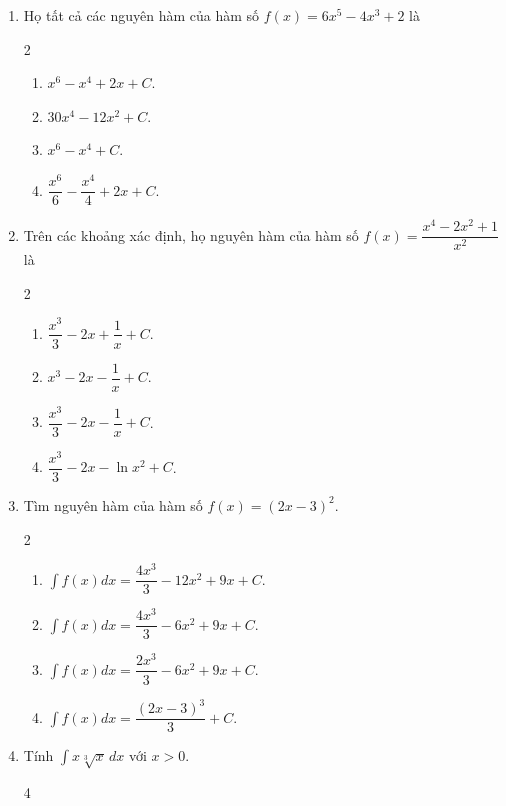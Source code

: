 \documentclass[12pt]{article}
\begin{document}
\begin{enumerate}[label=\textbf{Câu \arabic*.}]
		\item Họ tất cả các nguyên hàm của hàm số $f(x) = 6x^5 - 4x^3 + 2$ là
		\begin{multicols}{2}
			\begin{enumerate}[label=\textbf{\Alph*.}]
				\item $x^6 - x^4 + 2x + C$.
				\item $30x^4 - 12x^2 + C$.
				\item $x^6 - x^4 + C$.
				\item $\dfrac{x^6}{6} - \dfrac{x^4}{4} + 2x + C$.
			\end{enumerate}
		\end{multicols}
		
		\item Trên các khoảng xác định, họ nguyên hàm của hàm số $f(x) = \dfrac{x^4 - 2x^2 + 1}{x^2}$ là
		\begin{multicols}{2}
			\begin{enumerate}[label=\textbf{\Alph*.}]
				
				\item $\dfrac{x^3}{3} - 2x + \dfrac{1}{x} + C$.
				\item $x^3 - 2x - \dfrac{1}{x} + C$.
				\item $\dfrac{x^3}{3} - 2x - \dfrac{1}{x} + C$.
				\item $\dfrac{x^3}{3} - 2x - \ln x^2 + C$.
			\end{enumerate}
		\end{multicols}
		
		\item Tìm nguyên hàm của hàm số $f(x) = (2x - 3)^2$.
		\begin{multicols}{2}
			\begin{enumerate}[label=\textbf{\Alph*.}]
				
				\item $\displaystyle \int f(x)dx = \dfrac{4x^3}{3} - 12x^2 + 9x + C$.
				\item $\displaystyle \int f(x)dx = \dfrac{4x^3}{3} - 6x^2 + 9x + C$.
				\item $\displaystyle \int f(x)dx = \dfrac{2x^3}{3} - 6x^2 + 9x + C$.
				\item $\displaystyle \int f(x)dx = \dfrac{(2x - 3)^3}{3} + C$.
			\end{enumerate}
		\end{multicols}
		
		\item Tính $\displaystyle \int x\sqrt[3]{x} \,dx$ với $x > 0$.
		\begin{multicols}{4}
			\begin{enumerate}[label=\textbf{\Alph*.}]
				

\end{enumerate}
\end{multicols}
\end{enumerate}
\end{document}
